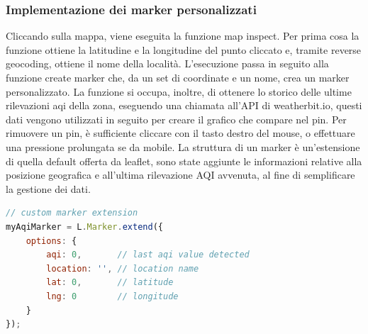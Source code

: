 \subsubsection{Implementazione dei marker personalizzati}
Cliccando sulla mappa, viene eseguita la funzione map inspect.
Per prima cosa la funzione ottiene la latitudine e la longitudine del punto cliccato e, tramite reverse geocoding, ottiene il nome della località.
L'esecuzione passa in seguito alla funzione create marker che, da un set di coordinate e un nome, crea un marker personalizzato.
La funzione si occupa, inoltre, di ottenere lo storico delle ultime rilevazioni aqi della zona, eseguendo una chiamata all'API di weatherbit.io, questi dati
vengono utilizzati in seguito per creare il grafico che compare nel pin.
Per rimuovere un pin, è sufficiente cliccare con il tasto destro del mouse, o effettuare una pressione prolungata se da mobile.
La struttura di un marker è un'estensione di quella default offerta da leaflet, sono state aggiunte le informazioni relative alla posizione geografica e all'ultima rilevazione AQI avvenuta, al fine di semplificare la gestione dei dati.
\begin{lstlisting}[language=Javascript]
// custom marker extension
myAqiMarker = L.Marker.extend({
    options: {
        aqi: 0,       // last aqi value detected
        location: '', // location name
        lat: 0,       // latitude
        lng: 0        // longitude
    }
});
\end{lstlisting}


